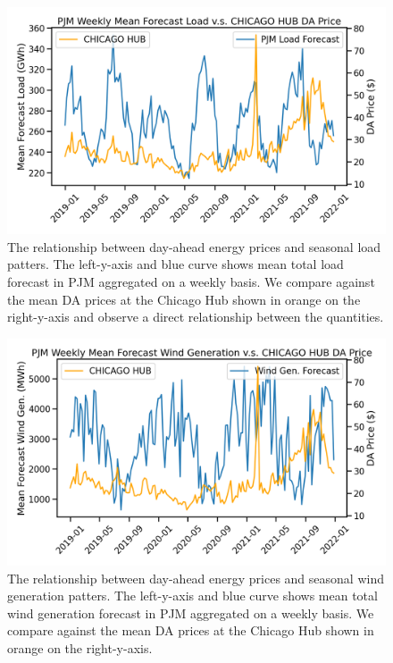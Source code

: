 \begin{figure}[htbp]
    \caption[Plot of the relationship between total aggregate load and day-ahead prices]{
        The relationship between day-ahead energy prices and seasonal load patters.
        The left-y-axis and blue curve shows mean total load forecast in PJM aggregated on a weekly basis.
        We compare against the mean DA prices at the Chicago Hub shown in orange on the right-y-axis and observe
        a direct relationship between the quantities.
    }
    \begin{center}
        \setlength{\fboxsep}{0pt}%
        \setlength{\fboxrule}{1pt}%
        \includegraphics[width=120mm]{figs/load_vs_price}
    \end{center}
    \label{fig:weekly_load}
\end{figure}

\begin{figure}[htbp]
    \caption[Plot of the relationship between total aggregate wind generation and day-ahead prices]{
        The relationship between day-ahead energy prices and seasonal wind generation patters.
        The left-y-axis and blue curve shows mean total wind generation forecast in PJM aggregated on a weekly basis.
        We compare against the mean DA prices at the Chicago Hub shown in orange on the right-y-axis.
    }
    \begin{center}
        \setlength{\fboxsep}{0pt}%
        \setlength{\fboxrule}{1pt}%
        \includegraphics[width=120mm]{figs/windgen_vs_price}
    \end{center}
    \label{fig:weekly_windgen}
\end{figure}

